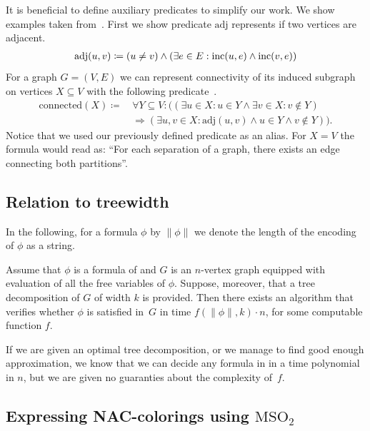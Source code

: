 It is beneficial to define auxiliary predicates to simplify our work.
We show examples taken from~\cite{book_parametrized_algorithms}.
First we show predicate \( \text{adj} \) represents if two vertices are adjacent.
%
\begin{align*}
	\text{adj}(u, v) \coloneqq (u \ne v) \land (\exists e \in E : \text{inc} (u, e) \land \text{inc} (v, e))
\end{align*}
%
For a graph \( G = (V, E) \) we can represent connectivity of its induced subgraph
on vertices \( X \subseteq V \) with the following predicate~\cite{book_parametrized_algorithms}.
%
\begin{align*}
	\text{connected}(X) \coloneqq \, &
	\forall Y \subseteq V : \Big(
	(
	\exists u \in X : u \in Y \land
	\exists v \in X : v \not\in Y
	)
	\\ &
	\Rightarrow
	(
	\exists u, v \in X : \text{adj}(u, v) \land u \in Y \land v \not\in Y
	)\Big).
\end{align*}
%
Notice that we used our previously defined predicate as an alias.
For \( X = V \) the formula would read as:
``For each separation of a graph, there exists an edge connecting both partitions''.

\subsection{Relation to treewidth}

In the following, for a formula \( \phi \) by \( \|\phi\| \)
we denote the length of the encoding of \( \phi \) as a string.
%
\begin{theorem}%
	\label{theorem:courcelles_theorem}%
	Assume that \( \phi \) is a formula of \MSO{} and
	\( G \) is an \( n \)-vertex graph equipped
	with evaluation of all the free variables of \( \phi \).
	Suppose, moreover, that a tree decomposition of \( G \) of width \( k \) is provided.
	Then there exists an algorithm that verifies whether \( \phi \)
	is satisfied in~\( G \) in time \( f (\|\phi\|, k) \cdot n \),
	for some computable function \( f \).
\end{theorem}
%
If we are given an optimal tree decomposition, or we manage to find good enough
approximation, we know that we can decide any formula in \MSO{} in a time
polynomial in \( n \), but we are given no guaranties about the complexity of~\( f \).

\subsection{Expressing NAC-colorings using \( \text{MSO}_2 \)}

